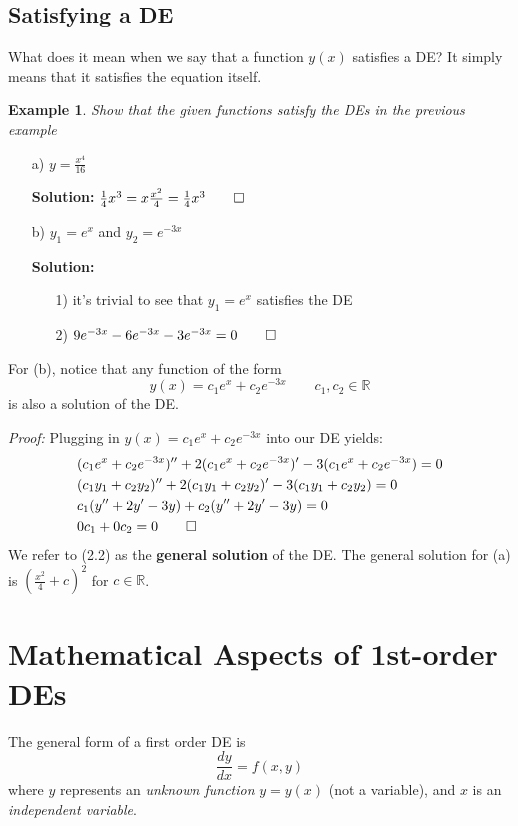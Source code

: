 \documentclass{report}
\newtheorem{ex}{Example}[section]
\begin{document}
\subsection{Satisfying a DE}
What does it mean when we say that a function $y(x)$ satisfies a DE? It simply means that it satisfies the equation itself.
\begin{ex}
Show that the given functions satisfy the DEs in the previous example
\end{ex}
\begin{enumerate}
    \item[a)] $y = \frac{x^4}{16}$
    
    \vspace{0.2cm}
    \textbf{Solution:} $\frac{1}{4}x^3 = x \frac{x^2}{4} = \frac{1}{4}x^3 \qed$
    \item[b)] $y_1 = e^x$ and $y_2 = e^{-3x}$ 
    
    \vspace{0.2cm}
    \textbf{Solution:}
    \begin{enumerate}
        \item[1)] it's trivial to see that $y_1 = e^x$ satisfies the DE
        \item[2)] $9e^{-3x} - 6e^{-3x} - 3e^{-3x} = 0 \qed$
    \end{enumerate}
\end{enumerate}
For (b), notice that any function of the form \begin{equation}
    y(x) = c_1e^x + c_2e^{-3x} \qquad c_1, c_2 \in \mathbb{R}
\end{equation}
is also a solution of the DE.

\vspace{0.2cm}\noindent
\textit{Proof:    } Plugging in $y(x) = c_1e^x + c_2e^{-3x}$ into our DE yields:
\begin{align}
    &(c_1e^x + c_2e^{-3x})^{\prime\prime} + 2(c_1e^x + c_2e^{-3x})^\prime - 3(c_1e^x + c_2e^{-3x}) = 0 \\
    &(c_1y_1 + c_2y_2)^{\prime\prime} + 2(c_1y_1 + c_2y_2)^\prime - 3(c_1y_1 + c_2y_2) = 0 \\
    &c_1(y^{\prime\prime} + 2y^\prime - 3y) + c_2(y^{\prime\prime} + 2y^\prime - 3y) = 0 \\
    &0c_1 + 0c_2 = 0 \qed
\end{align}
We refer to (2.2) as the \textbf{general solution} of the DE. The general solution for (a) is $\left(\frac{x^2}{4} + c\right)^2$ for $c \in \mathbb{R}$.
\section{Mathematical Aspects of 1st-order DEs}
The general form of a first order DE is
$$\frac{dy}{dx} = f(x,y)$$
where $y$ represents an \textit{unknown function} $y=y(x)$ (not a variable), and $x$ is an \textit{independent variable}.
\end{document}
